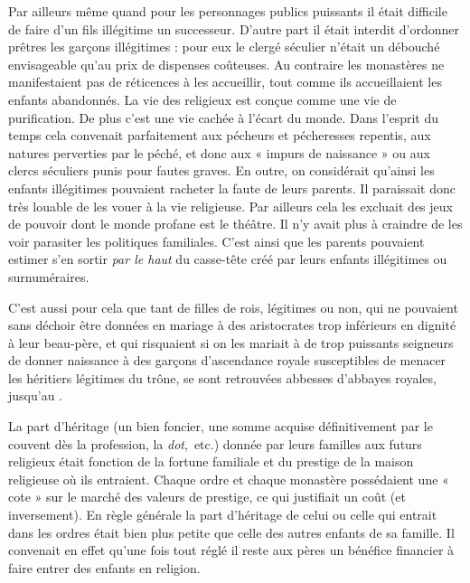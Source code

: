  Par ailleurs même quand pour les personnages publics puissants il était difficile de faire d'un fils illégitime un successeur. D'autre part il était interdit d'ordonner prêtres les garçons illégitimes : pour eux le clergé séculier n'était un débouché envisageable qu'au prix de dispenses coûteuses. Au contraire les monastères ne manifestaient pas de réticences à les accueillir, tout comme ils accueillaient les enfants abandonnés. La vie des religieux est conçue comme une vie de purification. De plus c'est une vie cachée à l'écart du monde. Dans l'esprit du temps cela convenait parfaitement aux pécheurs et pécheresses repentis, aux natures perverties par le péché, et donc aux « impurs de naissance » ou aux clercs séculiers punis pour fautes graves. En outre, on considérait qu'ainsi les enfants illégitimes pouvaient racheter la faute de leurs parents. Il paraissait donc très louable de les vouer à la vie religieuse. Par ailleurs cela les excluait des jeux de pouvoir dont le monde profane est le théâtre. Il n'y avait plus à craindre de les voir parasiter les politiques familiales. C'est ainsi que les parents pouvaient estimer s'en sortir \emph{par le haut} du casse-tête créé par leurs enfants illégitimes ou surnuméraires.
 
 C'est aussi pour cela que tant de filles de rois, légitimes ou non, qui ne pouvaient sans déchoir être données en mariage à des aristocrates trop inférieurs en dignité à leur beau-père, et qui risquaient si on les mariait à de trop puissants seigneurs de donner naissance à des garçons d'ascendance royale susceptibles de menacer les héritiers légitimes du trône, se sont retrouvées abbesses d'abbayes royales, jusqu'au . 

 La part d'héritage (un bien foncier, une somme acquise définitivement par le couvent dès la profession, la \emph{dot},~etc.) donnée par leurs familles aux futurs religieux était fonction de la fortune familiale et du prestige de la maison religieuse où ils entraient. Chaque ordre et chaque monastère possédaient une « cote » sur le marché des valeurs de prestige, ce qui justifiait un coût (et inversement). En règle générale la part d'héritage de celui ou celle qui entrait dans les ordres était bien plus petite que celle des autres enfants de sa famille. Il convenait en effet qu'une fois tout réglé il reste aux pères un bénéfice financier à faire entrer des enfants en religion. 

